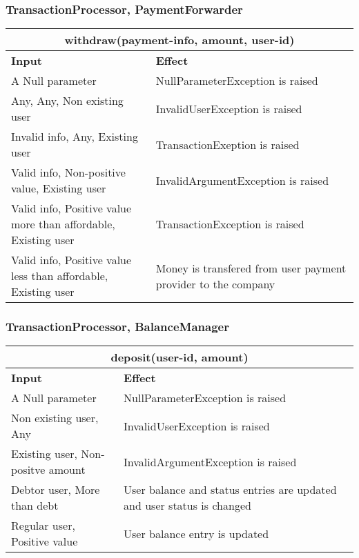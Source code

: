 \subsubsection{TransactionProcessor, PaymentForwarder}
\begin{tabular}{|p{5cm}|p{7cm}|}
\hline
\multicolumn{2}{|c|}{withdraw(payment-info, amount, user-id)} \\
\hline
\textbf{Input} & \textbf{Effect} \\

\hline
A Null parameter & NullParameterException is raised \\

\hline
Any, Any, Non existing user & InvalidUserException is raised \\

\hline
Invalid info, Any, Existing user & TransactionExeption is raised \\

\hline
Valid info, Non-positive value, Existing user & InvalidArgumentException is raised\\

\hline
Valid info, Positive value more than affordable, Existing user & TransactionException is raised\\

\hline
Valid info, Positive value less than affordable, Existing user & Money is transfered from user payment provider to the company\\
\hline
\end{tabular}

\subsubsection{TransactionProcessor, BalanceManager}
\begin{tabular}{|p{5cm}|p{7cm}|}
\hline
\multicolumn{2}{|c|}{deposit(user-id, amount)} \\
\hline
\textbf{Input} & \textbf{Effect} \\

\hline
A Null parameter & NullParameterException is raised \\

\hline
Non existing user, Any & InvalidUserException is raised \\

\hline
Existing user, Non-positve amount & InvalidArgumentException is raised \\

\hline
Debtor user, More than debt & User balance and status entries are updated and user status is changed \\

\hline
Regular user, Positive value & User balance entry is updated \\
\hline

\hline

\end{tabular}
